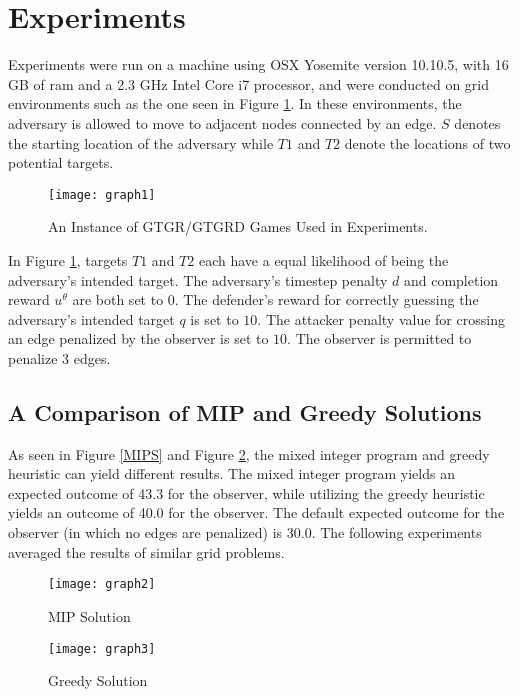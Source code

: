 \section{Experiments}
Experiments were run on a machine using OSX Yosemite version 10.10.5, with 16 GB of ram and a 2.3 GHz Intel Core i7 processor,
and were conducted on grid environments such as the one seen in Figure \ref{fig:setup}. 
In these environments, the adversary is allowed to move to adjacent nodes connected by an edge. 
$S$ denotes the starting location of the adversary while $T1$ and $T2$ denote the locations of two potential targets.
\begin{figure}[!ht]
\begin{center}
\texttt{[image: graph1]}
\caption{An Instance of GTGR/GTGRD Games Used in Experiments.}
\label{fig:setup}
\end{center}
\end{figure}

In Figure \ref{fig:setup}, targets $T1$ and $T2$ each have a equal likelihood of being the adversary's intended target. 
The adversary's timestep penalty $d$ and completion reward $u^{\theta}$ are both set to 0. 
The defender's reward for correctly guessing the adversary's intended target $q$ is set to $10$. 
The attacker penalty value for crossing an edge penalized by the observer is set to $10$. 
The observer is permitted to penalize 3 edges.

\subsection{A Comparison of MIP and Greedy Solutions}
As seen in Figure \ref{MIPS} and Figure \ref{GreedyS}, the mixed integer program and greedy heuristic can yield different results. 
The mixed integer program yields an expected outcome of 43.3 for the observer, 
while utilizing the greedy heuristic yields an outcome of 40.0 for the observer. 
The default expected outcome for the observer (in which no edges are penalized) is 30.0. 
The following experiments averaged the results of similar grid problems.

\begin{figure}[!ht]
\begin{center}
\begin{minipage}{0.4\linewidth}
\texttt{[image: graph2]}
\caption{MIP Solution}
\label{MIPS}
\end{minipage}%
\hfill
\begin{minipage}{0.4\linewidth} 
\texttt{[image: graph3]}
\caption{Greedy Solution}
\label{GreedyS}
\end{minipage}
\end{center}
\end{figure}

